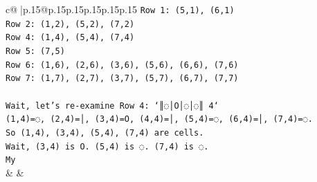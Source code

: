 \documentclass{article}
\begin{document}
{\begin{supertabular}{c@{$\;$}|p{.15\linewidth}@{}p{.15\linewidth}p{.15\linewidth}p{.15\linewidth}p{.15\linewidth}p{.15\linewidth}}
{{{\texttt{Row 1: (5,1), (6,1)} \\
\texttt{Row 2: (1,2), (5,2), (7,2)} \\
\texttt{Row 4: (1,4), (5,4), (7,4)} \\
\texttt{Row 5: (7,5)} \\
\texttt{Row 6: (1,6), (2,6), (3,6), (5,6), (6,6), (7,6)} \\
\texttt{Row 7: (1,7), (2,7), (3,7), (5,7), (6,7), (7,7)} \\
\\ 
\texttt{Wait, let's re{-}examine Row 4: `║◌│O│◌│◌║ 4`} \\
\texttt{(1,4)=◌, (2,4)=│, (3,4)=O, (4,4)=│, (5,4)=◌, (6,4)=│, (7,4)=◌.} \\
\texttt{So (1,4), (3,4), (5,4), (7,4) are cells.} \\
\texttt{Wait, (3,4) is O. (5,4) is ◌. (7,4) is ◌.} \\
\texttt{My} \\
            }
        }
    }
    & & \\ \\


\end{supertabular}}
\end{document}
